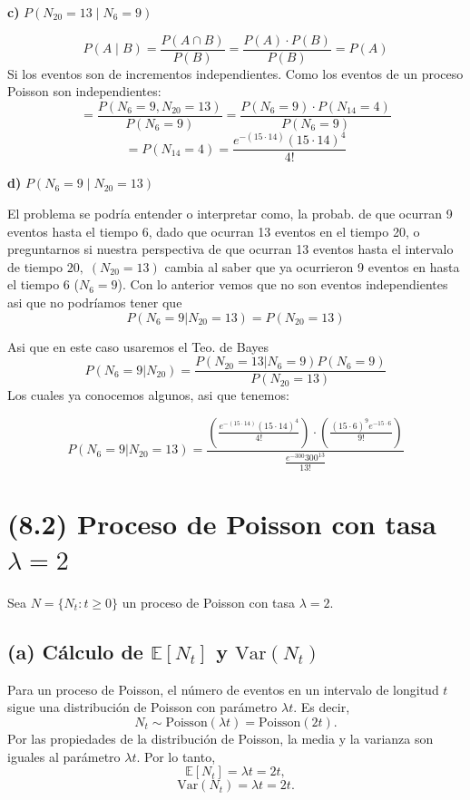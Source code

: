 \documentclass{article}
\begin{document}
\vspace{0.3cm}

\noindent
\textbf{c) } \(P(N_{20} = 13 \mid N_6 = 9)\)

\[
P(A \mid B) = \frac{P(A \cap B)}{P(B)} = \frac{P(A) \cdot P(B)}{P(B)} = P(A)
\]
Si los eventos son de incrementos independientes. Como los eventos de un proceso Poisson son independientes:
\[
= \frac{P(N_6 = 9, N_{20} = 13)}{P(N_6 = 9)} = \frac{P(N_6 = 9) \cdot P(N_{14} = 4)}{P(N_6 = 9)}
\]
\[
= P(N_{14} = 4) = \frac{e^{-(15 \cdot 14)} (15 \cdot 14)^4}{4!}
\]

\vspace{0.3cm}

\noindent
\textbf{d) } \(P(N_6 = 9 \mid N_{20} = 13)\)

El problema se podría entender o interpretar como, la probab. de que ocurran 9 eventos hasta el tiempo 6, dado que ocurran 13 eventos en el tiempo 20, o preguntarnos si nuestra perspectiva de que ocurran 13 eventos hasta el intervalo de tiempo $20, \; (N_{20}=13)$ cambia al saber que ya ocurrieron 9 eventos en hasta el tiempo 6 ($N_6=9$). Con lo anterior vemos que no son eventos independientes asi que no podríamos tener que 
\[
P(N_6 = 9 | N_{20} = 13) = P(N_{20}=13)
\]

Asi que en este caso usaremos el Teo. de Bayes
\[
P(N_6=9 | N_{20}) = \frac{P(N_{20} = 13 | N_6=9) P(N_6=9)  }{P(N_{20} = 13)}
\]
Los cuales ya conocemos algunos, asi que tenemos:

\[
P(N_6 = 9 | N_{20} = 13) = \frac{ \left( \frac{e^{-(15 \cdot 14)} (15 \cdot 14)^4}{4!} \right) \cdot \left( \frac{(15 \cdot 6)^9 e^{-15 \cdot 6}}{9!} \right) }{ \frac{e^{-300} 300^{13}  }{13!}}
\]




\newpage

\section*{(8.2) Proceso de Poisson con tasa $\lambda = 2$}

Sea \( N = \{N_t : t \geq 0\} \) un proceso de Poisson con tasa \( \lambda = 2 \).

\subsection*{(a) Cálculo de \( \mathbb{E}[N_t] \) y \( \text{Var}(N_t) \)}

Para un proceso de Poisson, el número de eventos en un intervalo de longitud \(t\) sigue una distribución de Poisson con parámetro \(\lambda t\). Es decir,
\[
N_t \sim \text{Poisson}(\lambda t) = \text{Poisson}(2t).
\]
Por las propiedades de la distribución de Poisson, la media y la varianza son iguales al parámetro \(\lambda t\). Por lo tanto,
\[
\mathbb{E}[N_t] = \lambda t = 2t,
\]
\[
\text{Var}(N_t) = \lambda t = 2t.
\]
\end{document}
